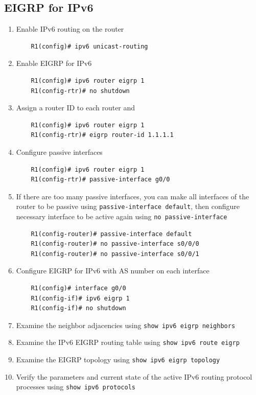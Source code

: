 \subsection{EIGRP for IPv6}

\begin{enumerate}
\item Enable IPv6 routing on the router
	\begin{verbatim}
	R1(config)# ipv6 unicast-routing 
	\end{verbatim}
	
\item Enable EIGRP for IPv6
	\begin{verbatim}
	R1(config)# ipv6 router eigrp 1 
	R1(config-rtr)# no shutdown 
	\end{verbatim}	
	
\item Assign a router ID to each router and 
	\begin{verbatim}
	R1(config)# ipv6 router eigrp 1 
	R1(config-rtr)# eigrp router-id 1.1.1.1
	\end{verbatim}

\item Configure passive interfaces
	\begin{verbatim}
	R1(config)# ipv6 router eigrp 1 
	R1(config-rtr)# passive-interface g0/0 
	\end{verbatim}
	
\item If there are too many passive interfaces, you can make all interfaces of the router to be passive using \verb|passive-interface default|, then configure necessary interface to be active again using \verb|no passive-interface|
	\begin{verbatim}
	R1(config-router)# passive-interface default
	R1(config-router)# no passive-interface s0/0/0
	R1(config-router)# no passive-interface s0/0/1
	\end{verbatim}	
	
\item Configure EIGRP for IPv6 with AS number on each interface
	\begin{verbatim}
	R1(config)# interface g0/0 
	R1(config-if)# ipv6 eigrp 1 
	R1(config-if)# no shutdown
	\end{verbatim}
	
\item Examine the neighbor adjacencies using \verb|show ipv6 eigrp neighbors|
\item Examine the IPv6 EIGRP routing table using \verb|show ipv6 route eigrp|
\item Examine the EIGRP topology using \verb|show ipv6 eigrp topology|
\item Verify the parameters and current state of the active IPv6 routing protocol processes using \verb|show ipv6 protocols|
	
\end{enumerate}